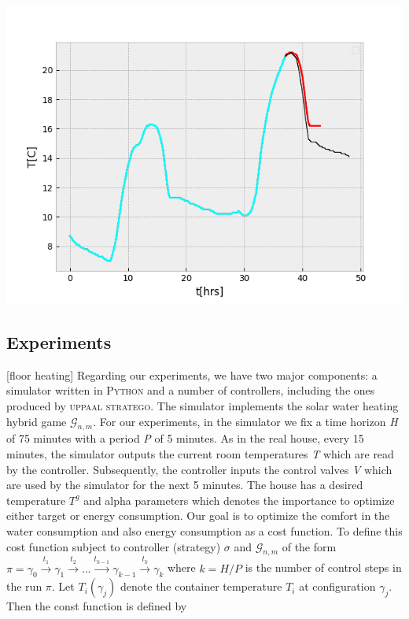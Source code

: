 \begin{minipage}{\linewidth}
    \begin{center}
        \includegraphics[width=0.8\linewidth]{images/prediction}
    \end{center}
\end{minipage}

\subsection{Experiments}
[floor heating]
Regarding our experiments, we have two major components: a simulator 
written in  \textsc{Python} and a number of controllers, including 
the ones produced by \textsc{uppaal stratego}. The simulator implements
the solar water heating hybrid game $\mathcal{G}_{n,m}$. For our 
experiments, in the simulator we fix a time horizon \emph{H} of 75 minutes
with a period \emph{P} of 5 minutes. As in the real house, every 
15 minutes, the simulator outputs the current room temperatures \emph{T}
which are read by the controller. Subsequently, the controller inputs
the control valves \emph{V} which are used by the simulator for the
next 5 minutes. The house has a desired temperature $T^g$ and alpha
parameters which denotes the importance to optimize either target or 
energy consumption. Our goal is to optimize the comfort in the water 
consumption and also energy consumption as a cost function. To define 
this cost function subject to controller (strategy) $\sigma$ and 
$\mathcal{G}_{n,m}$ of the form $\pi = \gamma_0 \xrightarrow{t_{1}} 
\gamma_1 \xrightarrow{t_{2}} ... \xrightarrow{t_{k-1}} 
\gamma_{k-1} \xrightarrow{t_{k}} \gamma_{k}$ where $k = H/P$ is the 
number of control steps in the run $\pi$. Let $T_{i}(\gamma_j)$ denote
the container temperature $T_i$ at configuration $\gamma_j$. Then the 
const function is defined by

